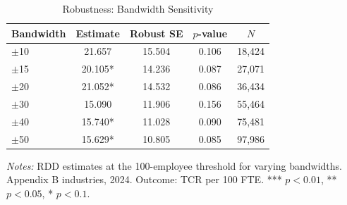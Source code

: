 \begin{table}[htbp]
\centering
\caption{Robustness: Bandwidth Sensitivity}
\label{tab:robustness}
\begin{tabular}{lcccc}
\toprule
Bandwidth & Estimate & Robust SE & $p$-value & $N$ \\
\midrule
$\pm$10 & 21.657 & 15.504 & 0.106 & 18,424 \\
$\pm$15 & 20.105* & 14.236 & 0.087 & 27,071 \\
$\pm$20 & 21.052* & 14.532 & 0.086 & 36,434 \\
$\pm$30 & 15.090 & 11.906 & 0.156 & 55,464 \\
$\pm$40 & 15.740* & 11.028 & 0.090 & 75,481 \\
$\pm$50 & 15.629* & 10.805 & 0.085 & 97,986 \\
\bottomrule
\end{tabular}
\par\vspace{0.5em}\begin{flushleft}\footnotesize
\textit{Notes:} RDD estimates at the 100-employee threshold for varying bandwidths. Appendix B industries, 2024. Outcome: TCR per 100 FTE. *** $p<0.01$, ** $p<0.05$, * $p<0.1$.
\end{flushleft}
\end{table}

